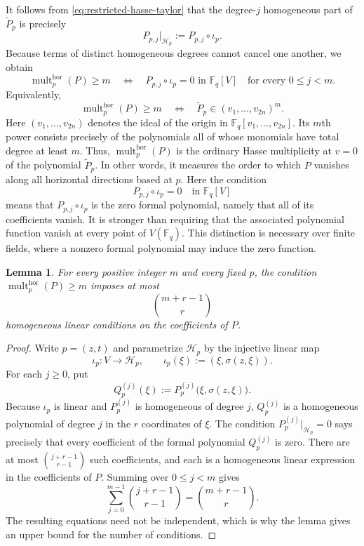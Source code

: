 \documentclass[11pt,letterpaper]{amsart}
\numberwithin{equation}{section}
\newtheorem{lemma}[lemma]{Lemma}
\theoremstyle{definition}
\theoremstyle{remark}
\newcommand{\Fq}{\mathbb F_q}
\begin{document}
It follows from \eqref{eq:restricted-hasse-taylor} that the
degree-$j$ homogeneous part of $\widetilde P_p$ is precisely
\[
 P_{p,j}\big|_{\mathcal H_p}
 :=
 P_{p,j}\circ\iota_p.
\]
Because terms of distinct homogeneous degrees cannot cancel one
another, we obtain
\begin{equation}\label{eq:horizontal-multiplicity-restriction}
 \operatorname{mult}^{\mathrm{hor}}_p(P)\geq m
 \quad\Longleftrightarrow\quad
 P_{p,j}\circ\iota_p=0
 \text{ in }\Fq[V]
 \quad\text{for every }0\leq j<m.
\end{equation}
Equivalently,
\[
 \operatorname{mult}^{\mathrm{hor}}_p(P)\geq m
 \quad\Longleftrightarrow\quad
 \widetilde P_p
 \in (v_1,\ldots,v_{2n})^m.
\]
Here $(v_1,\ldots,v_{2n})$ denotes the ideal of the origin in
$\Fq[v_1,\ldots,v_{2n}]$. Its $m$th power consists precisely of
the polynomials all of whose monomials have total degree at least $m$.
Thus, $\operatorname{mult}^{\mathrm{hor}}_p(P)$ is the ordinary Hasse multiplicity at $v=0$ of the polynomial $\widetilde P_p$. In other words, it measures the order to which $P$ vanishes along all horizontal
directions based at $p$. Here the condition
\[
 P_{p,j}\circ\iota_p=0\quad\text{in }\Fq[V]
\]
means that $P_{p,j}\circ\iota_p$ is the zero formal polynomial, namely
that all of its coefficients vanish. It is stronger than requiring
that the associated polynomial function vanish at every point of
$V(\Fq)$.  This distinction is necessary over finite fields, where a
nonzero formal polynomial may induce the zero function.



\begin{lemma}
\label{lem:multiplicity-condition-count}
For every positive integer $m$ and every fixed $p$, the condition
$\operatorname{mult}^{\mathrm{hor}}_p(P)\geq m$ imposes at most
\begin{equation}\label{eq:multiplicity-condition-count}
 \binom{m+r-1}{r}
\end{equation}
homogeneous linear conditions on the coefficients of $P$.
\end{lemma}

\begin{proof}
Write $p=(z,t)$ and parametrize $\mathcal H_p$ by the injective linear map
\[
 \iota_p:V\longrightarrow\mathcal H_p,
 \qquad
 \iota_p(\xi):=(\xi,\sigma(z,\xi)).
\]
For each $j\geq0$, put
\[
 Q_p^{(j)}(\xi)
 :=
 P_p^{(j)}\bigl(\xi,\sigma(z,\xi)\bigr).
\]
Because $\iota_p$ is linear and $P_p^{(j)}$ is homogeneous of degree $j$, $Q_p^{(j)}$ is a homogeneous polynomial of degree $j$ in the $r$ coordinates of $\xi$. The condition $P_p^{(j)}|_{\mathcal H_p}=0$ says precisely that every coefficient of the formal polynomial $Q_p^{(j)}$ is zero. There are at most $\binom{j+r-1}{r-1}$ such coefficients, and each is a homogeneous linear expression in the coefficients of $P$. Summing over $0\leq j<m$ gives
\[
 \sum_{j=0}^{m-1}\binom{j+r-1}{r-1}
 =\binom{m+r-1}{r}.
\]
The resulting equations need not be independent, which is why the lemma gives an upper bound for the number of conditions.
\end{proof}
\end{document}
